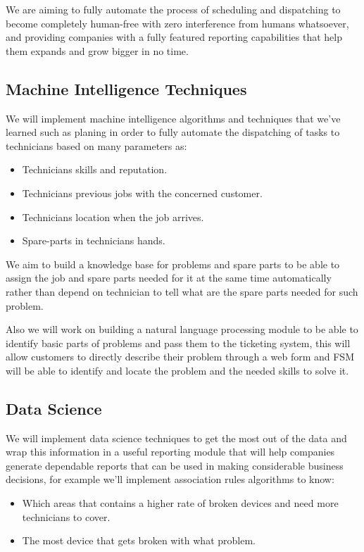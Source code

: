 We are aiming to fully automate the process of scheduling and dispatching to become completely human-free with zero interference from humans whatsoever, and providing companies with a fully featured reporting capabilities that help them expands and grow bigger in no time.
	
\subsection{Machine Intelligence Techniques}
	We will implement machine intelligence algorithms and techniques that we've learned such as planing\cite{artificial_intelligence,} in order to fully automate the dispatching of tasks to technicians based on many parameters as:
	\begin{itemize}
		\item Technicians skills and reputation.
		\item Technicians previous jobs with the concerned customer.
		\item Technicians location when the job arrives.
		\item Spare-parts in technicians hands.
	\end{itemize}
	
	We aim to build a knowledge base for problems and spare parts to be able to assign the job and spare parts needed for it at the same time automatically rather than depend on technician to tell what are the spare parts needed for such problem.
	
	Also we will work on building a natural language processing module to be able to identify basic parts of problems and pass them to the ticketing system, this will allow customers to directly describe their problem through a web form and FSM will be able to identify and locate the problem and the needed skills to solve it.
	
\subsection{Data Science}
	We will implement data science techniques to get the most out of the data and wrap this information in a useful reporting module that will help companies generate dependable reports that can be used in making considerable business decisions, for example we'll implement association rules algorithms to know:
	\begin{itemize}
		\item Which areas that contains a higher rate of broken devices and need more technicians to cover.
		\item The most device that gets broken with what problem.
	\end{itemize}
	  